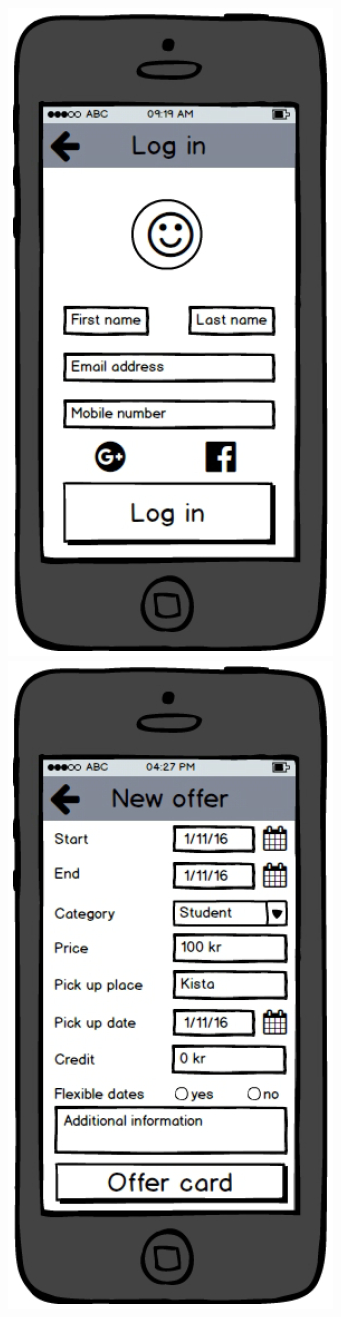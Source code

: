 \documentclass[11pt,twoside,a4paper]{report}
\begin{document}
\includegraphics[scale=0.3]{login.jpg} \\
\includegraphics[scale=0.3]{newoffer.jpg}
\end{document}
